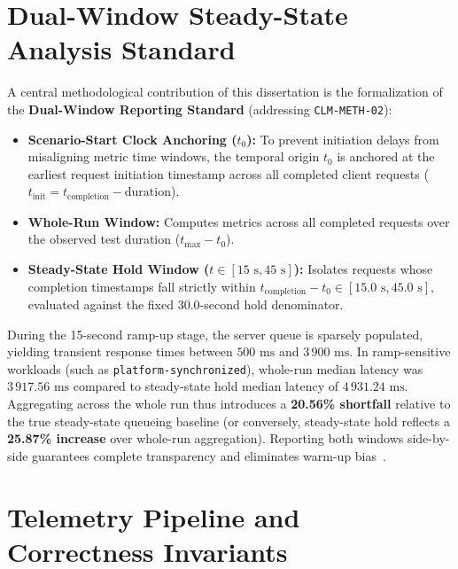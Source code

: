 \section{Dual-Window Steady-State Analysis Standard}
\label{sec:dual-window-standard}

A central methodological contribution of this dissertation is the formalization of the \textbf{Dual-Window Reporting Standard} (addressing \texttt{CLM-METH-02}):
\begin{itemize}
  \item \textbf{Scenario-Start Clock Anchoring ($t_0$):} To prevent initiation delays from misaligning metric time windows, the temporal origin $t_0$ is anchored at the earliest request initiation timestamp across all completed client requests ($t_{\text{init}} = t_{\text{completion}} - \text{duration}$).
  \item \textbf{Whole-Run Window:} Computes metrics across all completed requests over the observed test duration ($t_{\text{max}} - t_0$).
  \item \textbf{Steady-State Hold Window ($t \in [15\text{ s}, 45\text{ s}]$):} Isolates requests whose completion timestamps fall strictly within $t_{\text{completion}} - t_0 \in [15.0\text{ s}, 45.0\text{ s}]$, evaluated against the fixed 30.0-second hold denominator.
\end{itemize}

During the 15-second ramp-up stage, the server queue is sparsely populated, yielding transient response times between $500\text{ ms}$ and $3\,900\text{ ms}$. In ramp-sensitive workloads (such as \texttt{platform-synchronized}), whole-run median latency was $3\,917.56\text{ ms}$ compared to steady-state hold median latency of $4\,931.24\text{ ms}$. Aggregating across the whole run thus introduces a \textbf{20.56\% shortfall} relative to the true steady-state queueing baseline (or conversely, steady-state hold reflects a \textbf{25.87\% increase} over whole-run aggregation). Reporting both windows side-by-side guarantees complete transparency and eliminates warm-up bias~\cite{Traini2022}.

\section{Telemetry Pipeline and Correctness Invariants}
\label{sec:telemetry-correctness}

